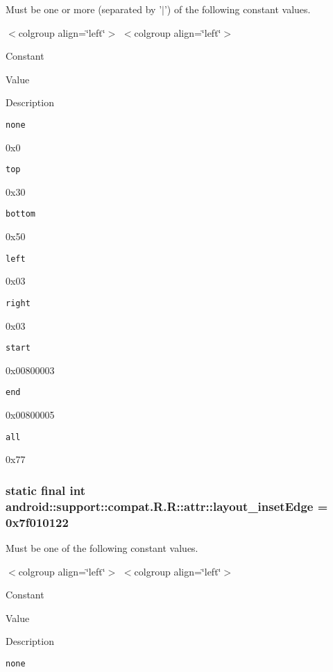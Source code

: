 Must be one or more (separated by '$|$') of the following constant values. \begin{TabularC}{0}
\hline
\end{TabularC}
$<$colgroup align=\char`\"{}left\char`\"{}$>$ $<$colgroup align=\char`\"{}left\char`\"{}$>$ 

Constant

Value

Description 

{\tt none}

0x0

{\tt top}

0x30

{\tt bottom}

0x50

{\tt left}

0x03

{\tt right}

0x03

{\tt start}

0x00800003

{\tt end}

0x00800005

{\tt all}

0x77\hypertarget{classandroid_1_1support_1_1compat_1_1_r_1_1attr_203c74402b77d90d0bdd3ba21dc9ce06}{
\subsubsection[{layout\_\-insetEdge}]{\setlength{\rightskip}{0pt plus 5cm}static final int android::support::compat.R.R::attr::layout\_\-insetEdge = 0x7f010122}}
\label{classandroid_1_1support_1_1compat_1_1_r_1_1attr_203c74402b77d90d0bdd3ba21dc9ce06}


Must be one of the following constant values. \begin{TabularC}{0}
\hline
\end{TabularC}
$<$colgroup align=\char`\"{}left\char`\"{}$>$ $<$colgroup align=\char`\"{}left\char`\"{}$>$ 

Constant

Value

Description 

{\tt none}

